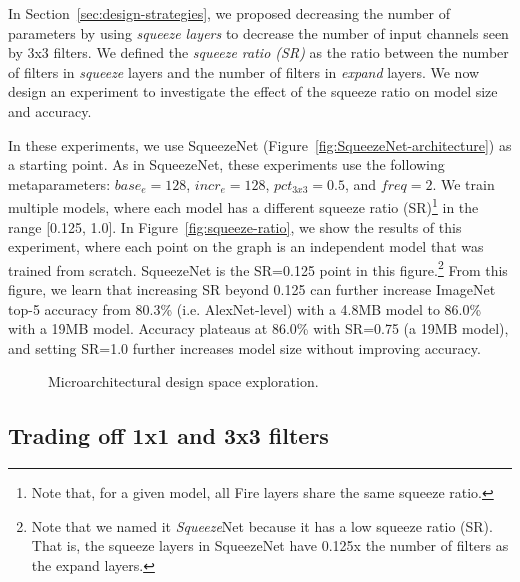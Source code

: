 \documentclass{article} \usepackage{iclr2017_conference,times}
\def\vsp{\vspace{-0.15in}}
\begin{document}
In Section~\ref{sec:design-strategies}, we proposed decreasing the number of parameters by using {\em squeeze layers} to decrease the number of input channels seen by 3x3 filters.
We defined the {\em squeeze ratio (SR)} as the ratio between the number of filters in {\em squeeze} layers and the number of filters in {\em expand} layers.
We now design an experiment to investigate the effect of the squeeze ratio on model size and accuracy.

In these experiments, we use SqueezeNet (Figure~\ref{fig:SqueezeNet-architecture}) as a starting point.
As in SqueezeNet, these experiments use the following metaparameters: $base_e = 128$, $incr_e = 128$, $pct_{3x3} = 0.5$, and $freq=2$.
We train multiple models, where each model has a different squeeze ratio (SR)\footnote{Note that, for a given model, all Fire layers share the same squeeze ratio.} in the range [0.125, 1.0].
In Figure~\ref{fig:squeeze-ratio}, we show the results of this experiment, where each point on the graph is an independent model that was trained from scratch.
SqueezeNet is the SR=0.125 point in this figure.\footnote{Note that we named it {\em Squeeze}Net because it has a low squeeze ratio (SR). That is, the squeeze layers in SqueezeNet have 0.125x the number of filters as the expand layers.}
From this figure, we learn that increasing SR beyond 0.125 can further increase ImageNet top-5 accuracy from 80.3\% (i.e. AlexNet-level) with a 4.8MB model to 86.0\% with a 19MB model.
Accuracy plateaus at 86.0\% with SR=0.75 (a 19MB model), and setting SR=1.0 further increases model size without improving accuracy.

\begin{figure}[!t]
	\centering
	\hspace{5pt}
	\label{fig:macroDSE}
	\caption{Microarchitectural design space exploration.}
\end{figure}


\subsection{Trading off 1x1 and 3x3 filters}
\label{sec:pct_3x3}
\vsp
\end{document}
